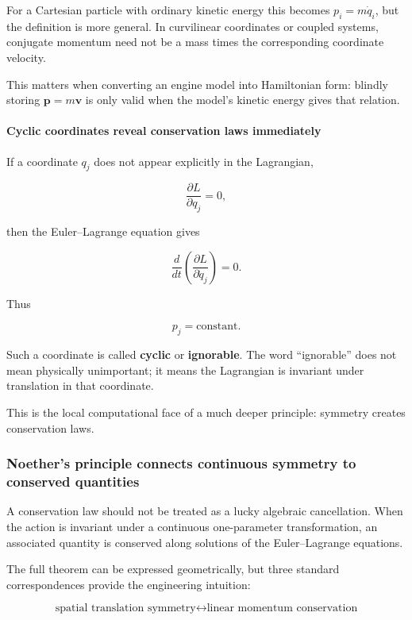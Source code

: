 For a Cartesian particle with ordinary kinetic energy this becomes \(p_i=m\dot q_i\), but the definition is more general. In curvilinear coordinates or coupled systems, conjugate momentum need not be a mass times the corresponding coordinate velocity.

This matters when converting an engine model into Hamiltonian form: blindly storing \(\mathbf p=m\mathbf v\) is only valid when the model's kinetic energy gives that relation.

\paragraph{Cyclic coordinates reveal conservation laws immediately}\label{02-foundations-ii-ch025-cyclic-coordinates-reveal-conservation-laws-immediately}

If a coordinate \(q_j\) does not appear explicitly in the Lagrangian,

\[
\frac{\partial L}{\partial q_j}=0,
\]

then the Euler--Lagrange equation gives

\[
\frac{d}{dt}
\left(
\frac{\partial L}{\partial\dot q_j}
\right)
=0.
\]

Thus

\[
\boxed{p_j=\text{constant}.}
\]

Such a coordinate is called \textbf{cyclic} or \textbf{ignorable}. The word ``ignorable'' does not mean physically unimportant; it means the Lagrangian is invariant under translation in that coordinate.

This is the local computational face of a much deeper principle: symmetry creates conservation laws.

\subsubsection{Noether's principle connects continuous symmetry to conserved quantities}\label{02-foundations-ii-ch025-noethers-principle-connects-continuous-symmetry-to-conserved-quantities}

A conservation law should not be treated as a lucky algebraic cancellation. When the action is invariant under a continuous one-parameter transformation, an associated quantity is conserved along solutions of the Euler--Lagrange equations.

The full theorem can be expressed geometrically, but three standard correspondences provide the engineering intuition:

\[
\boxed{
\text{spatial translation symmetry}
\longleftrightarrow
\text{linear momentum conservation}
}
\]


